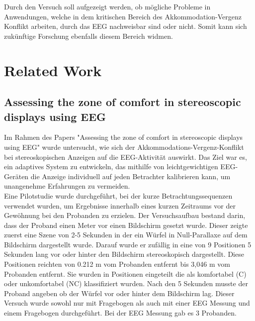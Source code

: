 \documentclass[conference]{IEEEtran}
\begin{document}
Durch den Versuch soll aufgezeigt werden, ob mögliche Probleme in Anwendungen, welche in dem kritischen Bereich des Akkommodation-Vergenz Konflikt arbeiten, durch das EEG nachweisbar sind oder nicht. Somit kann sich zukünftige Forschung ebenfalls diesem Bereich widmen.

\section{Related Work}
\subsection{Assessing the zone of comfort in stereoscopic displays using EEG}
Im Rahmen des Papers "Assessing the zone of comfort in stereoscopic displays using EEG" \cite{b1} wurde untersucht, wie sich der Akkommodations-Vergenz-Konflikt bei stereoskopischen Anzeigen auf die EEG-Aktivität auswirkt. Das Ziel war es, ein adaptives System zu entwickeln, das mithilfe von leichtgewichtigen EEG-Geräten die Anzeige individuell auf jeden Betrachter kalibrieren kann, um unangenehme Erfahrungen zu vermeiden.\\ 
Eine Pilotstudie wurde durchgeführt, bei der kurze Betrachtungssequenzen verwendet wurden, um Ergebnisse innerhalb eines kurzen Zeitraums vor der Gewöhnung bei den Probanden zu erzielen. Der Versuchsaufbau bestand darin, dass der Proband einen Meter vor einen Bildschirm gesetzt wurde. Dieser zeigte zuerst eine Szene von 2-5 Sekunden in der ein Würfel in Null-Parallaxe auf dem Bildschirm dargestellt wurde. Darauf wurde er zufällig in eine von 9 Positionen 5 Sekunden lang vor oder hinter den Bildschirm stereoskopisch dargestellt. Diese Positionen reichten von 0.212 m vom Probanden entfernt bis 3,046 m vom Probanden entfernt. Sie wurden in Positionen eingeteilt die als komfortabel (C) oder unkomfortabel (NC) klassifiziert wurden. Nach den 5 Sekunden musste der Proband angeben ob der Würfel vor oder hinter dem Bildschirm lag. Dieser Versuch wurde sowohl nur mit Fragebogen als auch mit einer EEG Messung und einem Fragebogen durchgeführt. Bei der EEG Messung gab es 3 Probanden.\\ 
\end{document}

